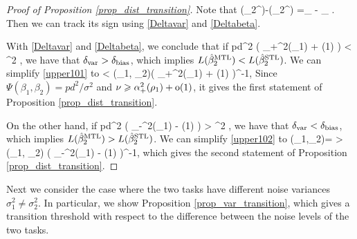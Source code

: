 \begin{proof}[Proof of Proposition \ref{prop_dist_transition}]
Note that 
 \be\label{var-beta}\te(\hat{\beta}_2^{\STL})-\te(\hat{\beta}_2^{\MTL}) =\delta_{\vari} - \delta_{\bias} .\ee
Then we can track its sign using \eqref{Deltavar} and \eqref{Deltabeta}.

 With \eqref{Deltavar} and \eqref{Deltabeta}, we conclude that if
\be\label{upper101}pd^2 \cdot {} \cdot \left( \al_+^2(\rho_1) +  \oo(1) \right) < \sigma^2  \cdot {},\ee
	we have that $\delta_{\text{var}} > \delta_{\text{bias}}$, which implies $L(\hat{\beta}_2^{\text{MTL}})<L(\hat{\beta}_2^{\text{STL}})$. We can simplify \eqref{upper101} to
	\be\label{pos1}    <   \Phi(\rho_1, \rho_2)\cdot \left( \al_+^2(\rho_1) +  \oo(1) \right)^{-1}, \ee
Since $ \Psi(\beta_1,\beta_2)=pd^2/\sigma^2$ and $\nu\geqslant \alpha_+^2(\rho_1) +  \operatorname{o}(1) $, it gives the first statement of Proposition \ref{prop_dist_transition}.	
 	
 On the other hand, if
\be\label{upper102}pd^2 \cdot {} \cdot \left( \al_-^2(\rho_1) -  \oo(1) \right) > \sigma^2  \cdot {},\ee
	we have that $\delta_{\text{var}} < \delta_{\text{bias}}$, which implies $L(\hat{\beta}_2^{\text{MTL}})>L(\hat{\beta}_2^{\text{STL}})$. We can simplify \eqref{upper102} to
	\be\label{neg1} \Psi(\beta_1,\beta_2)=  >  \Phi(\rho_1, \rho_2) \cdot \left( \al_-^2(\rho_1) -  \oo(1) \right)^{-1}, \ee
which gives the second statement of Proposition \ref{prop_dist_transition}.
\end{proof}


Next we consider the case where the two tasks have different noise variances $\sigma_1^2\ne \sigma_2^2$. In particular, we show Proposition \ref{prop_var_transition}, which gives a transition threshold with respect to the difference between the noise levels of the two tasks.

